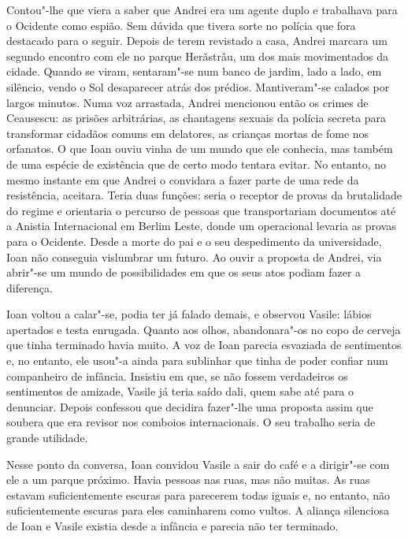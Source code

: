 Contou"-lhe que viera a saber que Andrei era um agente duplo e trabalhava
para o Ocidente como espião. Sem dúvida que tivera sorte no polícia que
fora destacado para o seguir. Depois de terem revistado a casa, Andrei
marcara um segundo encontro com ele no parque Herǎstrǎu, um dos mais
movimentados da cidade. Quando se viram, sentaram"-se num banco de
jardim, lado a lado, em silêncio, vendo o Sol desaparecer atrás dos
prédios. Mantiveram"-se calados por largos minutos. Numa voz arrastada,
Andrei mencionou então os crimes de Ceausescu: as prisões arbitrárias, as chantagens sexuais da polícia secreta para transformar
cidadãos comuns em delatores, as crianças mortas de fome nos orfanatos.
O que Ioan ouviu vinha de um mundo que ele conhecia, mas também de uma
espécie de existência que de certo modo tentara evitar. No entanto, no
mesmo instante em que Andrei o convidara a fazer parte de uma rede da
resistência, aceitara. Teria duas funções: seria o receptor de provas
da brutalidade do regime e orientaria o percurso de pessoas que
transportariam documentos até a Anistia Internacional em Berlim Leste,
donde um operacional levaria as provas para o Ocidente. Desde a morte do
pai e o seu despedimento da universidade, Ioan não conseguia
vislumbrar um futuro. Ao ouvir a proposta de Andrei, via abrir"-se um
mundo de possibilidades em que os seus atos podiam fazer a diferença.

Ioan voltou a calar"-se, podia ter já falado demais, e
observou Vasile: lábios apertados e testa enrugada. Quanto aos olhos,
abandonara"-os no copo de cerveja que tinha terminado havia muito. A voz
de Ioan parecia esvaziada de sentimentos e, no entanto, ele usou"-a ainda
para sublinhar que tinha de poder confiar num companheiro de infância.
Insistiu em que, se não fossem verdadeiros os sentimentos de amizade,
Vasile já teria saído dali, quem sabe até para o denunciar. Depois
confessou que decidira fazer"-lhe uma proposta assim que soubera que era
revisor nos comboios internacionais. O seu trabalho seria de grande
utilidade.

Nesse ponto da conversa, Ioan convidou Vasile a sair do café
e a dirigir"-se com ele a um parque próximo. Havia pessoas nas ruas, mas
não muitas. As ruas estavam suficientemente escuras para parecerem
todas iguais e, no entanto,
não suficientemente escuras para eles caminharem como vultos. A aliança
silenciosa de Ioan e Vasile existia desde a infância e parecia não ter
terminado.

